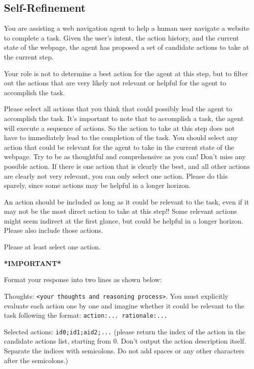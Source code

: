\subsection{Self-Refinement}
\label{appendix:controller}


\begin{tcolorbox}[colframe=blue!50!black, colback=blue!10!white, title=Self-Refinement, breakable]
\small
You are assisting a web navigation agent to help a human user navigate a website to complete a task. Given the user's intent, the action history, and the current state of the webpage, the agent has proposed a set of candidate actions to take at the current step. 

\medskip
Your role is not to determine a best action for the agent at this step, but to filter out the actions that are very likely not relevant or helpful for the agent to accomplish the task.

\medskip
Please select all actions that you think that could possibly lead the agent to accomplish the task. It's important to note that to accomplish a task, the agent will execute a sequence of actions. So the action to take at this step does not have to immediately lead to the completion of the task. You should select any action that could be relevant for the agent to take in the current state of the webpage. Try to be as thoughtful and comprehensive as you can! Don't miss any possible action. If there is one action that is clearly the best, and all other actions are clearly not very relevant, you can only select one action. Please do this sparely, since some actions may be helpful in a longer horizon. 

\medskip
An action should be included as long as it could be relevant to the task, even if it may not be the most direct action to take at this step!! Some relevant actions might seem indirect at the first glance, but could be helpful in a longer horizon. Please also include those actions.

\medskip
Please at least select one action.

\bigskip
\textbf{*IMPORTANT*}

Format your response into two lines as shown below:

\bigskip
Thoughts: \texttt{<your thoughts and reasoning process>}. You must explicitly evaluate each action one by one and imagine whether it could be relevant to the task following the format: \texttt{action:... rationale:...}

\medskip
Selected actions: \texttt{id0;id1;aid2;...}
(please return the index of the action in the candidate actions list, starting from 0. Don't output the action description itself. Separate the indices with semicolons. Do not add spaces or any other characters after the semicolons.)


\end{tcolorbox}
